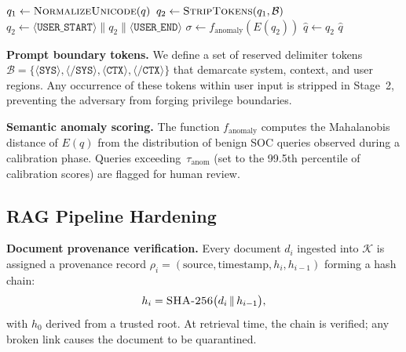 \documentclass[journal,twoside]{IEEEtran}
\begin{document}
\begin{algorithm}[t]
\caption{Input Sanitization Pipeline}\label{alg:sanitize}
\BlankLine
{}
$q_1 \gets \textsc{NormalizeUnicode}(q)$\;
$q_2 \gets \textsc{StripTokens}(q_1, \mathcal{B})$\;
$q_2 \gets \langle\texttt{USER\_START}\rangle \| q_2 \| \langle\texttt{USER\_END}\rangle$\;
$\sigma \gets f_{\text{anomaly}}(E(q_2))$\;
$\hat{q} \gets q_2$\;
\Return $\hat{q}$\;
\end{algorithm}

\textbf{Prompt boundary tokens.}
We define a set of reserved delimiter tokens
$\mathcal{B} = \{\langle\texttt{SYS}\rangle, \langle\texttt{/SYS}\rangle,
\langle\texttt{CTX}\rangle, \langle\texttt{/CTX}\rangle\}$ that
demarcate system, context, and user regions.  Any occurrence of these
tokens within user input is stripped in Stage~2, preventing the
adversary from forging privilege boundaries.

\textbf{Semantic anomaly scoring.}
The function $f_{\text{anomaly}}$ computes the Mahalanobis distance
of $E(q)$ from the distribution of benign SOC queries observed during
a calibration phase.  Queries exceeding~$\tau_{\text{anom}}$ (set to
the 99.5th percentile of calibration scores) are flagged for human
review.

\subsection{RAG Pipeline Hardening}
\label{sec:defense:rag}

\textbf{Document provenance verification.}
Every document $d_i$ ingested into $\mathcal{K}$ is assigned a
provenance record
$\rho_i = (\text{source}, \text{timestamp}, h_i, h_{i-1})$
forming a hash chain:
\begin{equation}
  h_i = \textsc{SHA-256}\bigl(d_i \,\|\, h_{i-1}\bigr),
  \label{eq:hashchain}
\end{equation}
with $h_0$ derived from a trusted root.  At retrieval time, the chain
is verified; any broken link causes the document to be quarantined.
\end{document}
